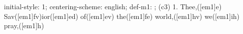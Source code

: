 initial-style: 1;
centering-scheme: english;
def-m1: \grealign;
(c3) 1. Thee,([em1]e) Sav([em1]fv)ior([em1]ed) of([em1]ev) the([em1]fe) world,([em1]hv) we([em1]ih) pray,([em1]h)